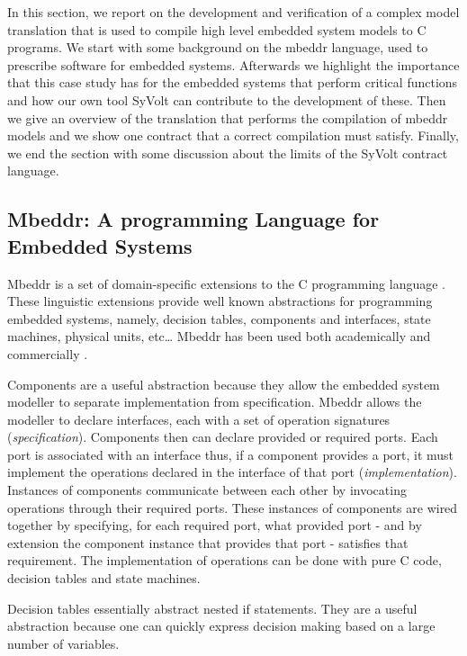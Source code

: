 
In this section, we report on the development and verification of a complex model translation that is used to compile high level embedded system models to C programs.
We start with some background on the mbeddr language, used to prescribe software for embedded systems. Afterwards we highlight the importance that this case study has for the embedded systems that perform critical functions and how our own tool SyVolt can contribute to the development of these.
Then we give an overview of the translation that performs the compilation of mbeddr models and we show one contract that a correct compilation must satisfy. Finally, we end the section with some discussion about the limits of the SyVolt contract language.

\subsection{Mbeddr: A programming Language for Embedded Systems}

Mbeddr is a set of domain-specific extensions to the C programming language \cite{Voelter:2012:MEC:2384716.2384767}. These linguistic extensions provide well known abstractions for programming embedded systems, namely, decision tables, components and interfaces, state machines, physical units, etc\ldots
Mbeddr has been used both academically and commercially \cite{Voelter2013,Voelter2014,mry_et_al:DR:2014:4543}.

Components are a useful abstraction because they allow the embedded system modeller to separate implementation from specification.
Mbeddr allows the modeller to declare interfaces, each with a set of operation signatures (\emph{specification}). Components then can declare provided or required ports. Each port is associated with an interface thus, if a component provides a port, it must implement the operations declared in the interface of that port (\emph{implementation}). 
Instances of components communicate between each other by invocating operations through their required ports. 
These instances of components are wired together by specifying, for each required port, what provided port - and by extension the component instance that provides that port - satisfies that requirement.
The implementation of operations can be done with pure C code, decision tables and state machines.

Decision tables essentially abstract nested if statements. They are a useful abstraction because one can quickly express decision making based on a large number of variables. 

